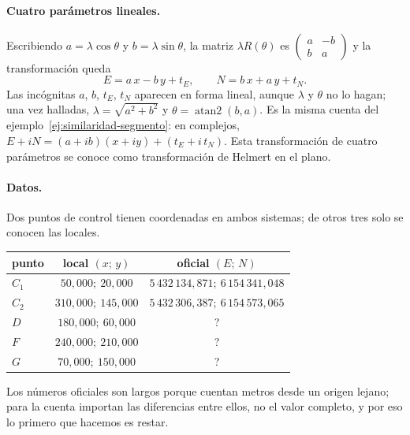 \paragraph{Cuatro parámetros lineales.} Escribiendo \(a=\lambda\cos\theta\) y
\(b=\lambda\sin\theta\), la matriz \(\lambda R(\theta)\) es
\(\left(\begin{smallmatrix}a&-b\\b&a\end{smallmatrix}\right)\) y la transformación queda
\[
  \boxed{E=a\,x-b\,y+t_E,\qquad N=b\,x+a\,y+t_N.}
\]
Las incógnitas \(a\), \(b\), \(t_E\), \(t_N\) aparecen en forma lineal, aunque \(\lambda\) y
\(\theta\) no lo hagan; una vez halladas, \(\lambda=\sqrt{a^2+b^2}\) y
\(\theta=\operatorname{atan2}(b,a)\). Es la misma cuenta del
ejemplo~\ref{ej:similaridad-segmento}: en complejos,
\(E+iN=(a+ib)(x+iy)+(t_E+i\,t_N)\). Esta transformación de cuatro parámetros se conoce como
transformación de Helmert en el plano.

\paragraph{Datos.} Dos puntos de control tienen coordenadas en ambos sistemas; de otros tres
solo se conocen las locales.
\begin{center}
\begin{tabular}{lcc}
\toprule
punto & local \((x;\,y)\) & oficial \((E;\,N)\)\\
\midrule
\(C_1\) & \(50{,}000;\ 20{,}000\) & \(5\,432\,134{,}871;\ 6\,154\,341{,}048\)\\
\(C_2\) & \(310{,}000;\ 145{,}000\) & \(5\,432\,306{,}387;\ 6\,154\,573{,}065\)\\
\(D\) & \(180{,}000;\ 60{,}000\) & ?\\
\(F\) & \(240{,}000;\ 210{,}000\) & ?\\
\(G\) & \(70{,}000;\ 150{,}000\) & ?\\
\bottomrule
\end{tabular}
\end{center}
Los números oficiales son largos porque cuentan metros desde un origen lejano; para la cuenta
importan las diferencias entre ellos, no el valor completo, y por eso lo primero que hacemos es
restar.

